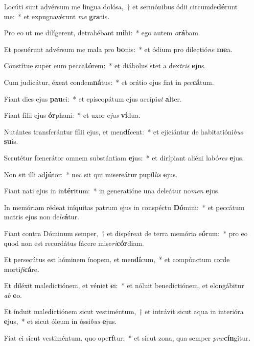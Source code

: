 \item Locúti sunt advérsum me lingua dolósa,~† et sermónibus ódii circumde\textbf{dé}runt me:~* et expugnavérunt \textit{me} \textbf{gra}tis.
\item Pro eo ut me dilígerent, detrahébant \textbf{mi}hi:~* ego autem \textit{o}\textbf{rá}bam.
\item Et posuérunt advérsum me mala pro \textbf{bo}nis:~* et ódium pro dilectió\textit{ne} \textbf{me}a.
\item Constítue super eum pecca\textbf{tó}rem:~* et diábolus stet a dex\textit{tris} \textbf{e}jus.
\item Cum judicátur, éxeat condem\textbf{ná}tus:~* et orátio ejus fiat in \textit{pec}\textbf{cá}tum.
\item Fiant dies ejus \textbf{pau}ci:~* et episcopátum ejus accípi\textit{at} \textbf{al}ter.
\item Fiant fílii ejus \textbf{ór}phani:~* et uxor e\textit{jus} \textbf{ví}dua.
\item Nutántes transferántur fílii ejus, et men\textbf{dí}cent:~* et ejiciántur de habitatióni\textit{bus} \textbf{su}is.
\item Scrutétur fœnerátor omnem substántiam \textbf{e}jus:~* et dirípiant aliéni labó\textit{res} \textbf{e}jus.
\item Non sit illi ad\textbf{jú}tor:~* nec sit qui misereátur pupíl\textit{lis} \textbf{e}jus.
\item Fiant nati ejus in in\textbf{tér}itum:~* in generatióne una deleátur no\textit{men} \textbf{e}jus.
\item In memóriam rédeat iníquitas patrum ejus in conspéctu \textbf{Dó}mini:~* et peccátum matris ejus non de\textit{le}\textbf{á}tur.
\item Fiant contra Dóminum semper,~† et dispéreat de terra memória e\textbf{ó}rum:~* pro eo quod non est recordátus fácere mise\textit{ri}\textbf{cór}diam.
\item Et persecútus est hóminem ínopem, et men\textbf{dí}cum,~* et compúnctum corde morti\textit{fi}\textbf{cá}re.
\item Et diléxit maledictiónem, et véniet \textbf{e}i:~* et nóluit benedictiónem, et elongábitur \textit{ab} \textbf{e}o.
\item Et índuit maledictiónem sicut vestiméntum,~† et intrávit sicut aqua in interióra \textbf{e}jus,~* et sicut óleum in óssi\textit{bus} \textbf{e}jus.
\item Fiat ei sicut vestiméntum, quo ope\textbf{rí}tur:~* et sicut zona, qua semper \textit{præ}\textbf{cín}gitur.
